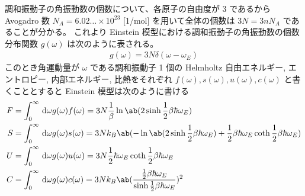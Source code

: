 \documentclass[uplatex,diffipdfmx,a4paper,11pt]{jlreq}
\numberwithin{equation}{section}
\theoremstyle{definition}
\begin{document}
調和振動子の角振動数の個数について、各原子の自由度が $3$ であるから Avogadro 数 $N_A = 6.02\ldots\times 10^{23}$ [\si{1/mol}] を用いて全体の個数は $3N = 3nN_A$ であることが分かる。
これより Einstein 模型における調和振動子の角振動数の個数分布関数 $g(\omega)$ は次のように表される。
\begin{align}
  g(\omega) = 3N\delta(\omega - \omega_E)
\end{align}
このとき角運動量が $\omega$ である調和振動子 1 個の Helmholtz 自由エネルギー, エントロピー, 内部エネルギー, 比熱をそれぞれ $f(\omega), s(\omega), u(\omega), c(\omega)$ と書くこととすると Einstein 模型は次のように書ける
\begin{align}
  F & = \int_0^\infty\dl{\omega}g(\omega)f(\omega) = 3N\frac{1}{\beta}\ln\ab(2\sinh \frac{1}{2}\beta\hbar\omega_E)                                                            \\
  S & = \int_0^\infty\dl{\omega}g(\omega)s(\omega) = 3Nk_B\ab(-\ln\ab(2\sinh\frac{1}{2}\beta\hbar\omega_E) + \frac{1}{2}\beta\hbar\omega_E\coth\frac{1}{2}\beta\hbar\omega_E) \\
  U & = \int_0^\infty\dl{\omega}g(\omega)u(\omega) = 3N\frac{1}{2}\hbar\omega_E\coth\frac{1}{2}\beta\hbar\omega_E                                                             \\
  C & = \int_0^\infty\dl{\omega}g(\omega)c(\omega) = 3Nk_B\ab(\frac{\frac{1}{2}\beta\hbar\omega_E}{\sinh\frac{1}{2}\beta\hbar\omega_E})^2
\end{align}
\end{document}
